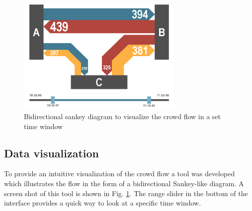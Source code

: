 \documentclass{IEEEtran}
\begin{document}
\begin{figure}
    \centering
    \includegraphics[width=80mm]{images/sankey_tool2.png}
    \caption{Bidirectional sankey diagram to visualize the crowd flow in a set time window}
    \label{fig:sankey}
\end{figure}

\subsection{Data visualization}
To provide an intuitive visualization of the crowd flow a tool was developed which illustrates the flow in the form of a bidirectional Sankey-like diagram. A screen shot of this tool is shown in Fig. \ref{fig:sankey}. The range slider in the bottom of the interface provides a quick way to look at a specific time window.
\end{document}
